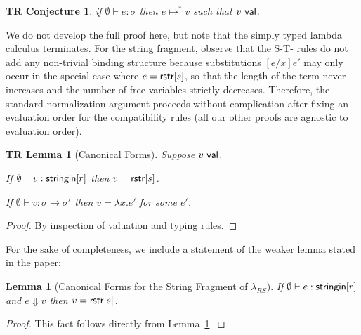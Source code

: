 \documentclass[12pt]{article}
\newtheorem{trthm}[tr]{TR Theorem}
\newtheorem{trlem}[tr]{TR Lemma}
\newtheorem{trconj}[tr]{TR Conjecture}
\newtheorem{lem}[thm]{Lemma}
\theoremstyle{definition}
\newcommand{\lambdas}{\lambda_{RS}}
\newcommand{\val}{{\sf val}}
\newcommand{\stringin}[1]{{\sf stringin}[#1]}
\newcommand{\sreduces}{ \Downarrow }
\begin{document}
\begin{trconj}
if $\emptyset \vdash e : \sigma$ then $e \mapsto^* v$ such that $v \ \val$.
\end{trconj}
We do not develop the full proof here, but note that the simply typed lambda calculus terminates.
For the string fragment, observe that the S-T- rules do not add any non-trivial binding structure because substitutions
$[e/x]e'$ may only occur in the special case where $e = {\sf rstr}[s]$, so that the length of the term
never increases and the number of free variables strictly decreases. Therefore, the standard normalization
argument proceeds without complication after fixing an evaluation order for the compatibility rules 
(all our other proofs are agnostic to evaluation order).

\begin{trlem}[Canonical Forms]\label{cfgen}
Suppose $v \ \val$.%

If $\emptyset\vdash v : \stringin{r}$ then $v = {\sf rstr}[s]$.

If $\emptyset\vdash v : \sigma \rightarrow \sigma'$ then $v = \lambda x . e'$ for some $e'$.
\end{trlem}
\begin{proof}
By inspection of valuation and typing rules.
\end{proof}

For the sake of completeness, we include a statement of the weaker lemma
stated in the paper:

\begin{lem}[Canonical Forms for the String Fragment of $\lambdas$]\label{thm:cfs}
  If $\emptyset \vdash e : \stringin{r}$ and $e \sreduces v$ then $v={\sf rstr}[s]$. 
\end{lem}
\begin{proof}
This fact follows directly from Lemma~\ref{cfgen}.
\end{proof}
\end{document}
